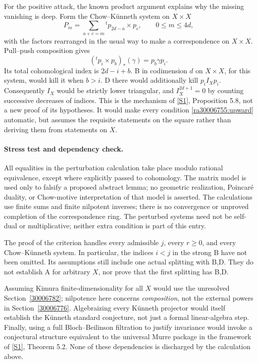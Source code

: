 \documentclass[11pt]{article}
\newcommand{\sref}[2]{\hyperlink{source:#1:#2}{[S#2]}}
\begin{document}
For the positive attack, the known product argument explains why the missing
vanishing is deep.  Form the Chow--K\"unneth system on $X\times X$
\[
 P_m=\sum_{a+c=m}{}^t p_{2d-a}\times p_c,
 \qquad 0\leq m\leq4d,
\]
with the factors rearranged in the usual way to make a correspondence on
$X\times X$.  Pull--push composition gives
\[
 ({}^t p_i\times p_b)_*(\gamma)=p_b\gamma p_i.
\]
Its total cohomological index is $2d-i+b$.  B in codimension $d$ on
$X\times X$, for this system, would kill it when $b>i$.  D there would
additionally kill $p_i I_X p_i$.  Consequently $I_X$ would be strictly
lower triangular, and $I_X^{2d+1}=0$ by counting successive decreases of
indices.  This is the mechanism of \sref{30006755}{1}, Proposition 5.8, not a new
proof of its hypotheses.  It would make every condition
\eqref{ra30006755:upward} automatic, but assumes the requisite statements on the
square rather than deriving them from statements on $X$.

\paragraph{Stress test and dependency check.}
All equalities in the perturbation calculation take place modulo rational
equivalence, except where explicitly passed to cohomology.  The matrix model
is used only to falsify a proposed abstract lemma; no geometric realization,
Poincar\'e duality, or Chow-motive interpretation of that model is asserted.
The calculations use finite sums and finite nilpotent inverses; there is no
convergence or unproved completion of the correspondence ring.  The perturbed
systems need not be self-dual or multiplicative; neither extra condition is
part of this entry.

The proof of the criterion handles every admissible $j$, every $r\geq0$,
and every Chow--K\"unneth system.  In particular, the indices $i<j$ in the
strong B have not been omitted.  Its assumptions still include one actual
splitting with B,D.  They do not establish A for arbitrary $X$, nor prove
that the first splitting has B,D.

Assuming Kimura finite-dimensionality for all $X$ would use the unresolved
Section~\ref{30006782}; nilpotence here concerns \emph{composition}, not the
external powers in Section~\ref{30006776}.  Algebraizing every K\"unneth projector
would itself establish the K\"unneth standard conjecture, not just a formal
linear-algebra step.  Finally, using a full Bloch--Beilinson filtration to
justify invariance would invoke a conjectural structure equivalent to the
universal Murre package in the framework of \sref{30006755}{1}, Theorem 5.2.
None of these dependencies is discharged by the calculation above.
\end{document}
